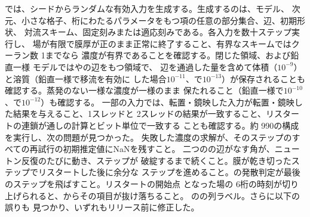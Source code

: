 では、シードからランダムな有効入力を生成する。生成するのは、モデル、
次元、小さな格子、桁にわたるパラメータをもつ項の任意の部分集合、辺、初期形状、
対流スキーム、固定刻みまたは適応刻みである。各入力を数十ステップ実行し、
場が有限で膜厚が正のまま正常に終了すること、有界なスキームではクーラン数 1までなら
濃度が有界であることを確認する。閉じた領域、および鉛直一様
モデルではやの辺をもつ領域で、
辺を通過した量を含めて体積（$10^{-9}$）と溶質（鉛直一様で移流を有効に
した場合$10^{-11}$、で$10^{-13}$）が保存されることも確認する。蒸発のない一様な濃度が一様のまま
保たれること（鉛直一様で$10^{-10}$、で$10^{-12}$）も確認する。
一部の入力では、転置・鏡映した入力が転置・鏡映した結果を与えること、1スレッドと
2スレッドの結果が一致すること、リスタートの連鎖が通しの計算とビット単位で一致する
ことも確認する。約 990の構成を実行し、次の問題が見つかった。
失敗した濃度の求解が、そのステップのすべての再試行の初期推定値にNaNを残すこと。
二つのの辺がなす角が、ニュートン反復のたびに動き、ステップが
破綻するまで続くこと。膜が乾き切ったステップでリスタートした後に余分な
ステップを進めること。の発散判定が最後のステップを飛ばすこと。リスタートの開始点
となった場の 6桁の時刻が切り上げられると、からその項目が抜け落ちること。
のの列ラベル。さらに以下の誤りも
見つかり、いずれもリリース前に修正した。

